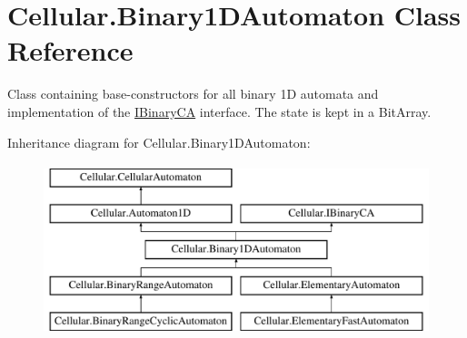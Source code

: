 \hypertarget{class_cellular_1_1_binary1_d_automaton}{}\section{Cellular.\+Binary1\+D\+Automaton Class Reference}
\label{class_cellular_1_1_binary1_d_automaton}


Class containing base-\/constructors for all binary 1\+D automata and implementation of the {\ttfamily \hyperlink{interface_cellular_1_1_i_binary_c_a}{I\+Binary\+C\+A}} interface. The state is kept in a {\ttfamily Bit\+Array}.  


Inheritance diagram for Cellular.\+Binary1\+D\+Automaton\+:\begin{figure}[H]
\begin{center}
\leavevmode
\includegraphics[height=5.000000cm]{class_cellular_1_1_binary1_d_automaton}
\end{center}
\end{figure}
